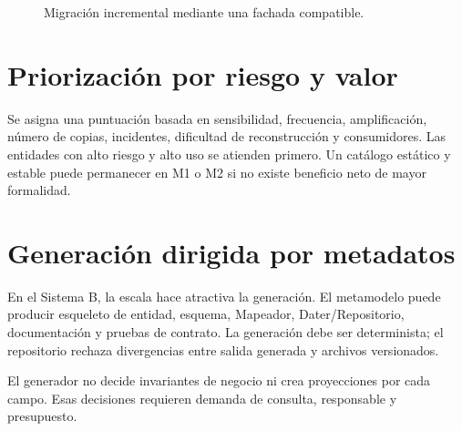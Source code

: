 \begin{figure}[H]
\centering
{}
\caption{Migración incremental mediante una fachada compatible.}
\label{fig:migracion-strangler}
\end{figure}

\section{Priorización por riesgo y valor}

Se asigna una puntuación basada en sensibilidad, frecuencia, amplificación, número de
copias, incidentes, dificultad de reconstrucción y consumidores. Las entidades con alto
riesgo y alto uso se atienden primero. Un catálogo estático y estable puede permanecer
en M1 o M2 si no existe beneficio neto de mayor formalidad.

\section{Generación dirigida por metadatos}

En el Sistema B, la escala hace atractiva la generación. El metamodelo puede producir
esqueleto de entidad, esquema, Mapeador, Dater/Repositorio, documentación y pruebas de
contrato. La generación debe ser determinista; el repositorio rechaza divergencias entre
salida generada y archivos versionados.

El generador no decide invariantes de negocio ni crea proyecciones por cada campo. Esas
decisiones requieren demanda de consulta, responsable y presupuesto.

